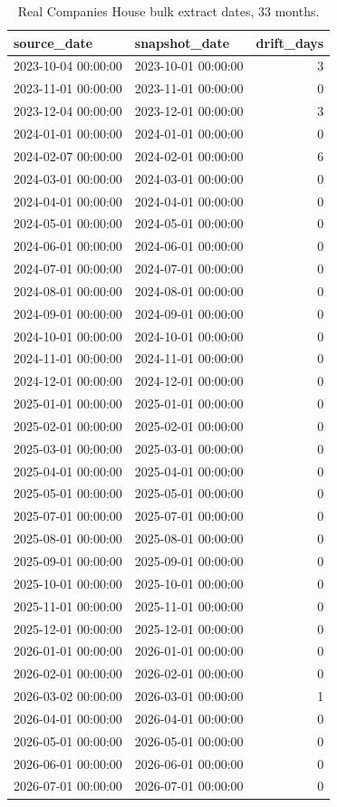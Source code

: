 \begin{table}
\caption{Real Companies House bulk extract dates, 33 months.}
\label{tab:nb16_extract_date_drift}
\begin{tabular}{llr}
\toprule
source_date & snapshot_date & drift_days \\
\midrule
2023-10-04 00:00:00 & 2023-10-01 00:00:00 & 3 \\
2023-11-01 00:00:00 & 2023-11-01 00:00:00 & 0 \\
2023-12-04 00:00:00 & 2023-12-01 00:00:00 & 3 \\
2024-01-01 00:00:00 & 2024-01-01 00:00:00 & 0 \\
2024-02-07 00:00:00 & 2024-02-01 00:00:00 & 6 \\
2024-03-01 00:00:00 & 2024-03-01 00:00:00 & 0 \\
2024-04-01 00:00:00 & 2024-04-01 00:00:00 & 0 \\
2024-05-01 00:00:00 & 2024-05-01 00:00:00 & 0 \\
2024-06-01 00:00:00 & 2024-06-01 00:00:00 & 0 \\
2024-07-01 00:00:00 & 2024-07-01 00:00:00 & 0 \\
2024-08-01 00:00:00 & 2024-08-01 00:00:00 & 0 \\
2024-09-01 00:00:00 & 2024-09-01 00:00:00 & 0 \\
2024-10-01 00:00:00 & 2024-10-01 00:00:00 & 0 \\
2024-11-01 00:00:00 & 2024-11-01 00:00:00 & 0 \\
2024-12-01 00:00:00 & 2024-12-01 00:00:00 & 0 \\
2025-01-01 00:00:00 & 2025-01-01 00:00:00 & 0 \\
2025-02-01 00:00:00 & 2025-02-01 00:00:00 & 0 \\
2025-03-01 00:00:00 & 2025-03-01 00:00:00 & 0 \\
2025-04-01 00:00:00 & 2025-04-01 00:00:00 & 0 \\
2025-05-01 00:00:00 & 2025-05-01 00:00:00 & 0 \\
2025-07-01 00:00:00 & 2025-07-01 00:00:00 & 0 \\
2025-08-01 00:00:00 & 2025-08-01 00:00:00 & 0 \\
2025-09-01 00:00:00 & 2025-09-01 00:00:00 & 0 \\
2025-10-01 00:00:00 & 2025-10-01 00:00:00 & 0 \\
2025-11-01 00:00:00 & 2025-11-01 00:00:00 & 0 \\
2025-12-01 00:00:00 & 2025-12-01 00:00:00 & 0 \\
2026-01-01 00:00:00 & 2026-01-01 00:00:00 & 0 \\
2026-02-01 00:00:00 & 2026-02-01 00:00:00 & 0 \\
2026-03-02 00:00:00 & 2026-03-01 00:00:00 & 1 \\
2026-04-01 00:00:00 & 2026-04-01 00:00:00 & 0 \\
2026-05-01 00:00:00 & 2026-05-01 00:00:00 & 0 \\
2026-06-01 00:00:00 & 2026-06-01 00:00:00 & 0 \\
2026-07-01 00:00:00 & 2026-07-01 00:00:00 & 0 \\
\bottomrule
\end{tabular}
\end{table}
